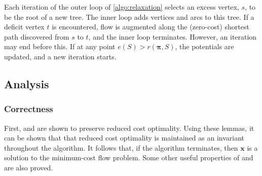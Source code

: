 Each iteration of the outer loop of \cref{algo:relaxation} selects an excess vertex, $s$, to be the root of a new tree. The inner loop adds vertices and arcs to this tree. If a deficit vertex $t$ is encountered, flow is augmented along the (zero-cost) shortest path discovered from $s$ to $t$, and the inner loop terminates. However, an iteration may end before this. If at any point $e(S) > r(\boldsymbol{\pi},S)$, the potentials are updated, and a new iteration starts\footnotemark.

\subsection{Analysis} \label{sec:impl-relax-analysis}

\subsubsection{Correctness}

First,  and  are shown to preserve reduced cost optimality. Using these lemmas, it can be shown that that reduced cost optimality is maintained as an invariant throughout the algorithm. It follows that, if the algorithm terminates, then $\mathbf{x}$ is a solution to the minimum-cost flow problem. Some other useful properties of  and  are also proved.\\

